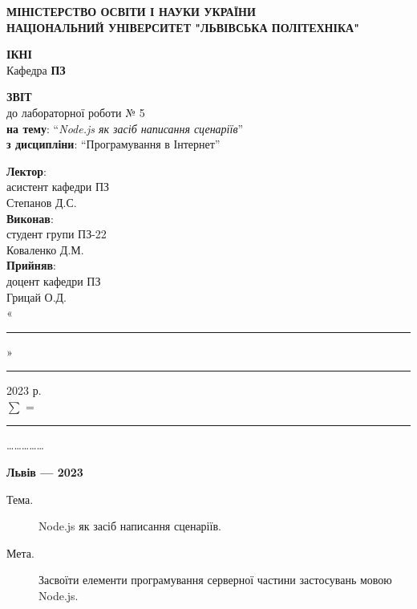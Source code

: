\documentclass{article}
\newcommand\subject{Програмування в Інтернет}
\newcommand\lecturer{асистент кафедри ПЗ \\ Степанов Д.С.}
\newcommand\teacher{доцент кафедри ПЗ \\ Грицай О.Д.}
\newcommand\mygroup{ПЗ-22}
\newcommand\lab{5}
\newcommand\theme{Node.js як засіб написання сценаріїв}
\newcommand\purpose{Засвоїти елементи програмування серверної частини застосувань мовою
	Node.js}
\begin{document}
\begin{normalsize}
\begin{titlepage}
	\thispagestyle{empty}
	\begin{center}
		\textbf{МІНІСТЕРСТВО ОСВІТИ І НАУКИ УКРАЇНИ\\
			НАЦІОНАЛЬНИЙ УНІВЕРСИТЕТ "ЛЬВІВСЬКА ПОЛІТЕХНІКА"}
	\end{center}
	\begin{flushright}
		\textbf{ІКНІ}\\
		Кафедра \textbf{ПЗ}
	\end{flushright}
	\vspace{200pt}
	\begin{center}
		\textbf{ЗВІТ}\\
		\vspace{10pt}
		до лабораторної роботи № \lab\\
		\textbf{на тему}: “\textit{\theme}”\\
		\textbf{з дисципліни}: “\subject”
	\end{center}
	\vspace{112pt}
	\begin{flushright}
		
		\textbf{Лектор}:\\
		\lecturer\\
		\vspace{28pt}
		\textbf{Виконав}:\\
		
		студент групи \mygroup\\
		Коваленко Д.М.\\
		\vspace{28pt}
		\textbf{Прийняв}:\\
		
		\teacher\\
		
		\vspace{28pt}
		«\rule{1cm}{0.15mm}» \rule{1.5cm}{0.15mm} 2023 р.\\
		$\sum$ = \rule{1cm}{0.15mm}……………\\
		
	\end{flushright}
	\vspace{\fill}
	\begin{center}
		\textbf{Львів — 2023}
	\end{center}
\end{titlepage}
	
\begin{description}
	\item[Тема.] \theme.
	\item[Мета.] \purpose.
\end{description}


\end{normalsize}
\end{document}
